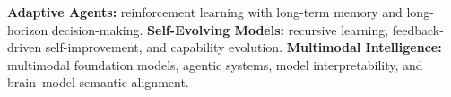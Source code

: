 
\begin{cvparagraph}
\textbf{Adaptive Agents:} reinforcement learning with long-term memory and
long-horizon decision-making. \quad
\textbf{Self-Evolving Models:} recursive learning, feedback-driven
self-improvement, and capability evolution. \quad
\textbf{Multimodal Intelligence:} multimodal foundation models, agentic
systems, model interpretability, and brain--model semantic alignment.
\end{cvparagraph}
